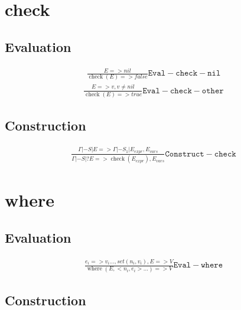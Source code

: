 \documentclass{scrartcl}
\DeclareMathOperator{\checkop}{check}
\DeclareMathOperator{\where}{where}
\begin{document}
    \section{check}
    
    \subsection{Evaluation}
    
    \begin{align*}
        \frac{
            E => nil
        }{
            \checkop(E) => false
        }\mathtt{Eval-check-nil}
    \end{align*}
    \begin{align*}
        \frac{
            E => v, v \neq nil
        }{
            \checkop(E) => true
        }\mathtt{Eval-check-other}
    \end{align*}
    
    \subsection{Construction}
    
    \begin{align*}
    \frac{
            \Gamma |- S | E => \Gamma |- S_1 | E_{expr}, E_{vars}
        }{
            \Gamma |- S | ?E => \checkop(E_{expr}), E_{vars}
        }\mathtt{Construct-check}
    \end{align*}
    
    \section{where}
    
    \subsection{Evaluation}
    
    \begin{align*}
    \frac{
            e_i => v_i..., set(n_i, v_i), E => V
        }{
            \where(E, <n_i, e_i>...) => V
        }\mathtt{Eval-where}
    \end{align*}
    
    \subsection{Construction}
    
\end{document}
